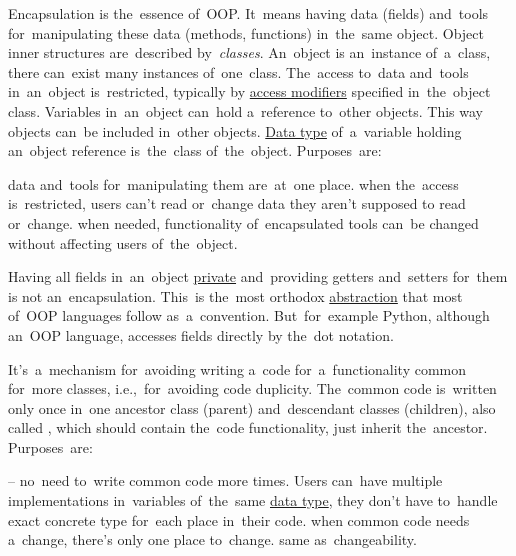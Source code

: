 
\label{encapsulation}
Encapsulation is the~essence of~OOP\@.
It~means having data (fields) and~tools for~manipulating these data (methods, functions) in~the~same object.
Object inner structures are~described \mbox{by \textit{classes}}.
An~object is an~instance of~a~class, there can~exist many instances of~one~class.
The~access to~data and~tools in~an~object is~restricted, typically by \hyperref[javaaccessmodifiers]{access modifiers} specified in~the~object class.
Variables in~an~object can~hold a~reference to~other objects.
This way objects can~be included in~other objects.
\hyperref[datatypes]{Data type} of~a~variable holding an~object reference is~the~class of~the~object.
Purposes~are:
\begin{itemize}
     data and~tools for~manipulating them are~at~one place.
     when the~access is~restricted, users can't read or~change data they aren't supposed to read or~change.
     when needed, functionality of~encapsulated tools can~be changed without affecting users of~the~object.
\end{itemize}
\newpage

\warning Having all fields in~an~object \hyperref[javaprivate]{private} and~providing getters and~setters for~them is not an~encapsulation.
This~is the~most orthodox \hyperref[abstraction]{abstraction} that most of~OOP languages follow as~a~convention.
But~for~example Python, although an~OOP language, accesses fields directly by the~dot notation.

\label{inheritance}
It's~a~mechanism for~avoiding writing a~code for~a~functionality common for~more classes, i.e.,~for~avoiding code duplicity.
The~common code is~written only once in~one ancestor class (parent) and~descendant classes (children), also called , which should contain the~code functionality, just inherit the~ancestor.
Purposes~are:
\begin{itemize}
     -- no~need to~write common code more times.
            Users can~have multiple implementations in~variables of~the~same \hyperref[datatypes]{data type}, they don't have to~handle exact concrete type for~each place in~their code.
     when common code needs a~change, there's only one place to~change.
     same as~changeability.
\end{itemize}

